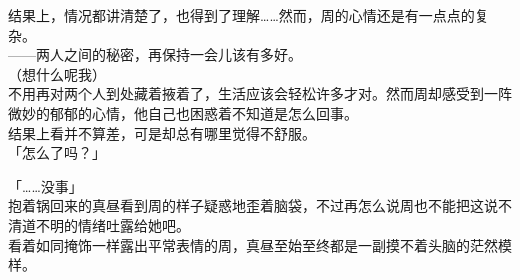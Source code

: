 结果上，情况都讲清楚了，也得到了理解……然而，周的心情还是有一点点的复杂。\\

——两人之间的秘密，再保持一会儿该有多好。\\

（想什么呢我）\\

不用再对两个人到处藏着掖着了，生活应该会轻松许多才对。然而周却感受到一阵微妙的郁郁的心情，他自己也困惑着不知道是怎么回事。\\

结果上看并不算差，可是却总有哪里觉得不舒服。\\

「怎么了吗？」

「……没事」\\

抱着锅回来的真昼看到周的样子疑惑地歪着脑袋，不过再怎么说周也不能把这说不清道不明的情绪吐露给她吧。\\

看着如同掩饰一样露出平常表情的周，真昼至始至终都是一副摸不着头脑的茫然模样。\\

